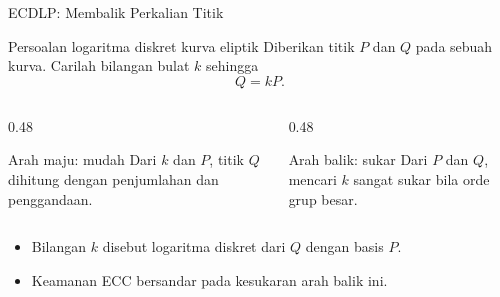 \documentclass[aspectratio=169,11pt]{beamer}
\begin{document}
\begin{frame}{ECDLP: Membalik Perkalian Titik}
    \begin{block}{Persoalan logaritma diskret kurva eliptik}
        \footnotesize
        Diberikan titik $P$ dan $Q$ pada sebuah kurva. Carilah bilangan bulat
        $k$ sehingga
        \[
            Q = kP .
        \]
    \end{block}
    \vspace{0.1cm}
    \begin{columns}[T,onlytextwidth]
        \begin{column}{0.48\textwidth}
            \begin{exampleblock}{Arah maju: mudah}
                \footnotesize
                Dari $k$ dan $P$, titik $Q$ dihitung dengan penjumlahan dan
                penggandaan.
            \end{exampleblock}
        \end{column}
        \begin{column}{0.48\textwidth}
            \begin{alertblock}{Arah balik: sukar}
                \footnotesize
                Dari $P$ dan $Q$, mencari $k$ sangat sukar bila orde grup
                besar.
            \end{alertblock}
        \end{column}
    \end{columns}
    \vspace{0.1cm}
    \begin{itemize}
        \item Bilangan $k$ disebut logaritma diskret dari $Q$ dengan basis
              $P$.
        \item Keamanan ECC bersandar pada kesukaran arah balik ini.
    \end{itemize}
\end{frame}
\end{document}
